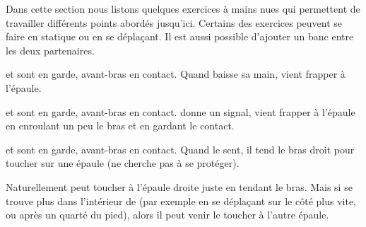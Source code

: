 Dans cette section nous listons quelques exercices à mains nues qui permettent de travailler différents points abordés jusqu'ici.
Certains des exercices peuvent se faire en statique ou en se déplaçant.
Il est aussi possible d'ajouter un banc entre les deux partenaires.


\begin{exercice}
	\label{struct:ex:contact:frappe-signal}

	

	\A et \D sont en garde, avant-bras en contact.
	Quand \A baisse sa main, \D vient frapper à l'épaule.

\end{exercice}


\begin{exercice}

	
	
	\A et \D sont en garde, avant-bras en contact.
	\A donne un signal, \D vient frapper à l'épaule en enroulant un peu le bras et en gardant le contact.

\end{exercice}


\begin{exercice}
	\label{struct:ex:contact:frappe-épaules}

	

	\A et \D sont en garde, avant-bras en contact.
	Quand \A le sent, il tend le bras droit pour toucher \D sur une épaule (\D ne cherche pas à se protéger).

	Naturellement \A peut toucher \D à l'épaule droite juste en tendant le bras.
	Mais si \A se trouve plus dans l'intérieur de \D (par exemple en se déplaçant sur le côté plus vite, ou après un quarté du pied), alors il peut venir le toucher à l'autre épaule.
\end{exercice}


